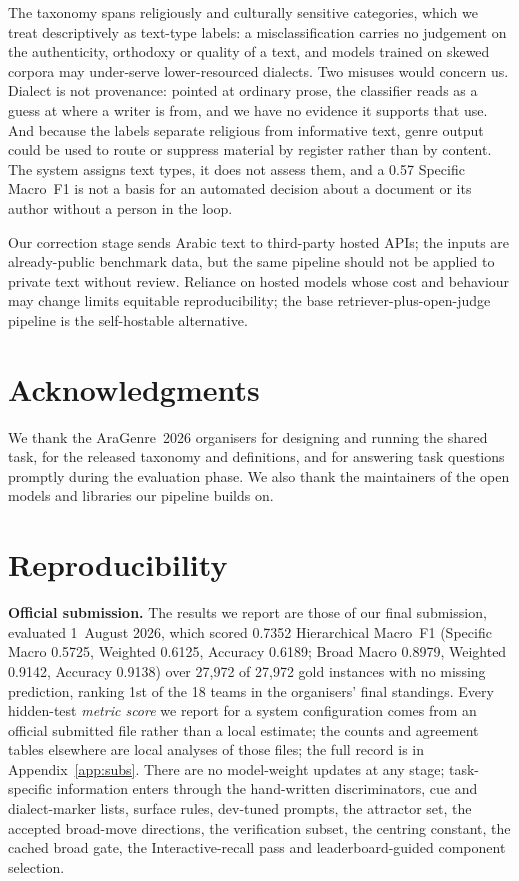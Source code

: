 \documentclass[11pt]{article}
\begin{document}
The taxonomy spans religiously and culturally sensitive categories, which we treat descriptively
as text-type labels: a misclassification carries no judgement on the authenticity, orthodoxy or
quality of a text, and models trained on skewed corpora may under-serve lower-resourced
dialects. Two misuses would concern us. Dialect is not provenance: pointed at ordinary prose,
the classifier reads as a guess at where a writer is from, and we have no evidence it supports
that use. And because the labels separate religious from informative text, genre output could be
used to route or suppress material by register rather than by content. The system assigns text
types, it does not assess them, and a 0.57 Specific Macro~F1 is not a basis for an automated
decision about a document or its author without a person in the loop.

Our correction stage sends Arabic text to third-party hosted APIs; the inputs are already-public
benchmark data, but the same pipeline should not be applied to private text without review.
Reliance on hosted models whose cost and behaviour may change limits equitable reproducibility;
the base retriever-plus-open-judge pipeline is the self-hostable alternative.

\section*{Acknowledgments}
We thank the AraGenre~2026 organisers for designing and running the shared task, for the
released taxonomy and definitions, and for answering task questions promptly during the evaluation
phase. We also thank the maintainers of
the open models and libraries our pipeline builds on.



\appendix

\section{Reproducibility}
\label{app:repro}
\textbf{Official submission.} The results we report are those of our final submission,
evaluated 1~August 2026, which scored 0.7352 Hierarchical Macro~F1 (Specific Macro 0.5725,
Weighted 0.6125, Accuracy 0.6189; Broad Macro 0.8979, Weighted 0.9142, Accuracy 0.9138) over
27{,}972 of 27{,}972 gold instances with no missing prediction, ranking 1st of the 18 teams in
the organisers' final standings. Every hidden-test \emph{metric score} we report for a system
configuration comes from an official submitted file rather than a local estimate; the counts and
agreement tables elsewhere are local analyses of those files; the full record is in
Appendix~\ref{app:subs}.
There are no model-weight updates at any stage; task-specific information enters through the
hand-written discriminators, cue and dialect-marker lists, surface rules, dev-tuned prompts, the
attractor set, the accepted broad-move directions, the verification subset, the centring
constant, the cached broad gate, the Interactive-recall pass and leaderboard-guided component
selection.
\end{document}
